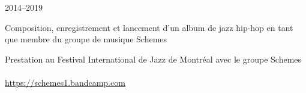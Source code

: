 

\begin{cventries}

  \cventry
    {} %
    {} %
    {} %
    {2014--2019} %
    {
      \begin{cvitems} %
        \item {Composition, enregistrement et lancement d'un album de jazz hip-hop en tant que membre du groupe de musique Schemes}
        \item {Prestation au Festival International de Jazz de Montréal avec le groupe Schemes\\\\\url{https://schemes1.bandcamp.com}}
      \end{cvitems}
    }

\end{cventries}
